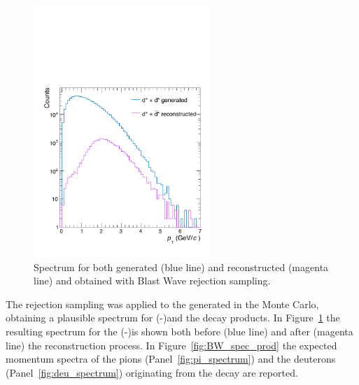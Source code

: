 \begin{figure} [htb]
    \centering
    \includegraphics[width=0.6\textwidth]{gfx/genrecBW}
	\caption{Spectrum for both generated (blue line) and reconstructed (magenta line) \dsbar and \ds obtained with Blast Wave rejection sampling.}
	\label{fig:bw_spectrum}
\end{figure}

The rejection sampling was applied to the \ds generated in the Monte Carlo, obtaining a 
plausible \pt spectrum for (\dsbar-)\ds and the decay products. In Figure~\ref{fig:bw_spectrum} the
resulting \pt spectrum for the (\dsbar-)\ds is shown both before (blue line) and after (magenta line) the
reconstruction process. 
In Figure~\ref{fig:BW_spec_prod} the expected momentum spectra of the pions 
(Panel~\ref{fig:pi_spectrum}) and the deuterons (Panel~\ref{fig:deu_spectrum}) originating from
the \ds decay are reported.

